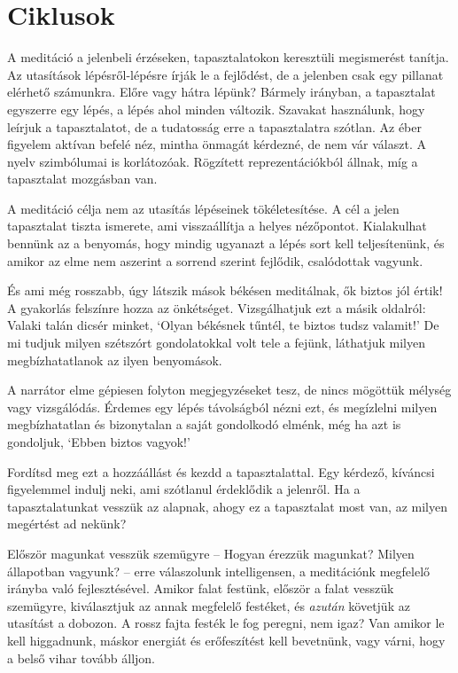 \chapter{Ciklusok}


\noindent A meditáció a jelenbeli érzéseken, tapasztalatokon keresztüli
megismerést tanítja. Az utasítások lépésről-lépésre írják le a
fejlődést, de a jelenben csak egy pillanat elérhető számunkra. Előre
vagy hátra lépünk? Bármely irányban, a tapasztalat egyszerre egy lépés,
a lépés ahol minden változik. Szavakat használunk, hogy leírjuk a
tapasztalatot, de a tudatosság erre a tapasztalatra szótlan. Az éber
figyelem aktívan befelé néz, mintha önmagát kérdezné, de nem vár
választ. A nyelv szimbólumai is korlátozóak. Rögzített reprezentációkból
állnak, míg a tapasztalat mozgásban van.

A meditáció célja nem az utasítás lépéseinek tökéletesítése. A cél a
jelen tapasztalat tiszta ismerete, ami visszaállítja a helyes
nézőpontot. Kialakulhat bennünk az a benyomás, hogy mindig ugyanazt a
lépés sort kell teljesítenünk, és amikor az elme nem aszerint a sorrend
szerint fejlődik, csalódottak vagyunk.


És ami még rosszabb, úgy látszik mások békésen meditálnak, ők biztos jól
értik! A gyakorlás felszínre hozza az önkétséget. Vizsgálhatjuk ezt a
másik oldalról: Valaki talán dicsér minket, `Olyan békésnek tűntél, te
biztos tudsz valamit!' De mi tudjuk milyen szétszórt gondolatokkal volt
tele a fejünk, láthatjuk milyen megbízhatatlanok az ilyen benyomások.

A narrátor elme gépiesen folyton megjegyzéseket tesz, de nincs mögöttük
mélység vagy vizsgálódás. Érdemes egy lépés távolságból nézni ezt, és
megízlelni milyen megbízhatatlan és bizonytalan a saját gondolkodó
elménk, még ha azt is gondoljuk, `Ebben biztos vagyok!'

Fordítsd meg ezt a hozzáállást és kezdd a tapasztalattal. Egy kérdező,
kíváncsi figyelemmel indulj neki, ami szótlanul érdeklődik a jelenről.
Ha a tapasztalatunkat vesszük az alapnak, ahogy ez a tapasztalat most
van, az milyen megértést ad nekünk?

Először magunkat vesszük szemügyre -- Hogyan érezzük magunkat? Milyen
állapotban vagyunk? -- erre válaszolunk intelligensen, a meditációnk
megfelelő irányba való fejlesztésével. Amikor falat festünk, először a
falat vesszük szemügyre, kiválasztjuk az annak megfelelő festéket, és
\emph{azután} követjük az utasítást a dobozon. A rossz fajta festék le
fog peregni, nem igaz? Van amikor le kell higgadnunk, máskor energiát és
erőfeszítést kell bevetnünk, vagy várni, hogy a belső vihar tovább
álljon.

